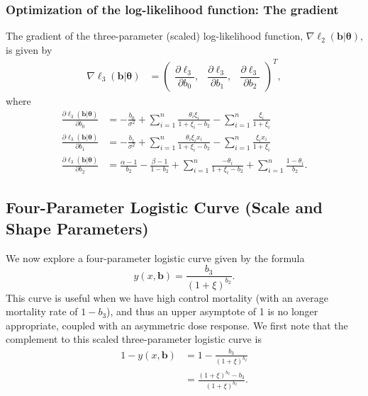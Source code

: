 \documentclass[11pt, letterpaper]{article}
\numberwithin{equation}{section}
\begin{document}
\subsubsection{Optimization of the log-likelihood function: The gradient}
The gradient of the three-parameter (scaled) log-likelihood function, $\nabla \ell_2(\bm b | \bm \theta)$, is given by
\begin{align*}
\nabla \ell_3(\bm b | \bm \theta) &= \begin{pmatrix}
\dfrac{\partial \ell_3}{\partial b_0},   & \dfrac{\partial \ell_3}{\partial b_1} , & \dfrac{\partial \ell_3}{\partial b_2} 
\end{pmatrix}^T,
\end{align*}
where 
\begin{align*}
\frac{\partial \ell_3 (\bm b | \bm \theta)}{\partial b_0}   &= -\frac{b_0}{\sigma^2} + \sum_{i=1}^n \frac{\theta_i\xi_i}{1+\xi_i - b_2} - \sum_{i=1}^n \frac{\xi_i}{1+ \xi_i} \\
\frac{\partial \ell_3 (\bm b | \bm \theta)}{\partial b_1}   &= -\frac{b_1}{\sigma^2} + \sum_{i=1}^n \frac{\theta_i \xi_i x_i}{1+\xi_i - b_2} - \sum_{i=1}^n \frac{\xi_i x_i}{1+ \xi_i} \\
\frac{\partial \ell_3 (\bm b | \bm \theta)}{\partial b_2}   &= \frac{\alpha -1}{b_2} - \frac{\beta-1}{1-b_2} + \sum_{i=1}^n \frac{-\theta_i }{1+\xi_i- b_2}  + \sum_{i=1}^n \frac{1-\theta_i}{b_2}.
\end{align*}


\subsection{Four-Parameter Logistic Curve (Scale and Shape Parameters)}
We now explore a four-parameter logistic curve given by the formula
$$ y(x, \bm b) = \frac{b_3}{(1+\xi)^{b_2}} .$$ 
This curve is useful when we have high control mortality (with an average mortality rate of $1-b_3$), and thus an upper asymptote of 1 is no longer appropriate, coupled with an asymmetric dose response. We first note that the complement to this scaled three-parameter logistic curve is 
\begin{align*}
1 - y(x, \bm b) & = 1- \frac{b_3}{(1+\xi)^{b_2}} \\
& = \frac{(1+\xi)^{b_2} - b_3}{(1+\xi)^{b_2}}.
\end{align*}
\end{document}

